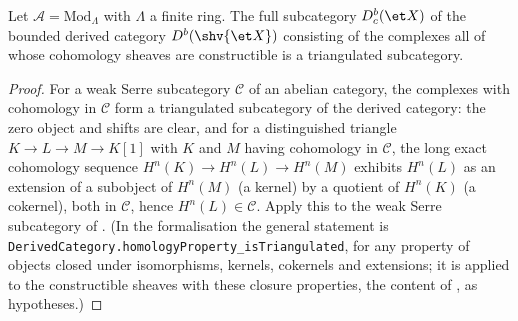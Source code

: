 \begin{proposition}
\label{prop:constructible-derived-subcategory}
\leanok
Let $\mathcal A=\mathrm{Mod}_\Lambda$ with $\Lambda$ a finite ring.  The
full subcategory $D^b_c(\et X)$ of the bounded derived category
$D^b(\shv{\et X})$ consisting of the complexes all of whose cohomology
sheaves are constructible is a triangulated subcategory.
\end{proposition}
\begin{proof}
\leanok
For a weak Serre subcategory $\mathcal C$ of an abelian category, the
complexes with cohomology in $\mathcal C$ form a triangulated subcategory
of the derived category: the zero object and shifts are clear, and for a
distinguished triangle $K\to L\to M\to K[1]$ with $K$ and $M$ having
cohomology in $\mathcal C$, the long exact cohomology sequence
$H^{n}(K)\to H^n(L)\to H^n(M)$ exhibits $H^n(L)$ as an extension of a
subobject of $H^n(M)$ (a kernel) by a quotient of $H^n(K)$ (a cokernel),
both in $\mathcal C$, hence $H^n(L)\in\mathcal C$.  Apply this to the weak
Serre subcategory of .  (In the formalisation the
general statement is \texttt{DerivedCategory.homologyProperty\_isTriangulated}, for any
property of objects closed under isomorphisms, kernels, cokernels and extensions; it is
applied to the constructible sheaves with these closure properties, the content of
, as hypotheses.)
\end{proof}
